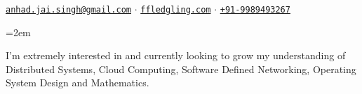 \documentclass[a4paper,10pt]{scrartcl}
\date{} %
\newcommand{\MarginText}[1]{\marginpar{\raggedleft\itshape\small#1}} %
\newlength{\datebox}\settowidth{\datebox}{Spring 2011 } %
\newcommand{\NewEntry}[3]{\noindent\hangindent=2em\hangafter=0 \parbox{\datebox}{\small \textit{#1}}\hspace{1.5em} #2 #3 %
\vspace{0.5em}} %
\newcommand{\Description}[1]{\hangindent=2em\hangafter=0\noindent\raggedright\footnotesize{#1}\par\normalsize\vspace{1em}} %
\begin{document}
\thispagestyle{empty} %


\begin{cv}{}\vspace{1.5em} %

\noindent\large{}\normalsize\vspace{0.5em} %

\href{mailto:anhad.jai.singh+resume@gmail.com}{\texttt{anhad.jai.singh@gmail.com}}
$\cdotp$
\href{https://ffledgling.com}{\texttt{ffledgling.com}}
$\cdotp$
\href{tel:+919989493267}{\texttt{+91-9989493267}}


% 

\vspace{1em} %

\noindent\large{}\normalsize\vspace{0.25em} %

\Description{I'm extremely interested in and currently looking to grow my understanding of Distributed Systems, Cloud Computing, Software Defined Networking, Operating System Design and Mathematics.}
\vspace{0.5em} %


\large{}\normalsize\vspace{0.5em}


\end{cv}
\end{document}
